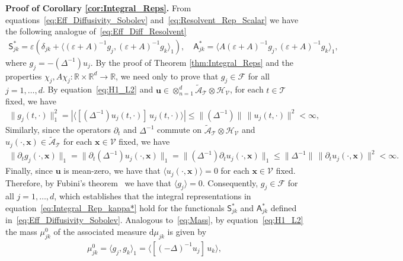\documentclass[leqno,onefignum,onetabnum]{siamltex1213}
\renewcommand{\d}{\mathrm{d}}
\newcommand{\Qb}{\mathbf{Q}}
\newcommand{\Tc}{\mathcal{T}}
\newcommand{\Vc}{\mathcal{V}}
\newcommand{\Sm}{\mathsf{S}}
\newcommand{\Am}{\mathsf{A}}
\newcommand{\Hs}{\mathscr{H}}
\newcommand{\As}{\mathscr{A}}
\newcommand{\Fs}{\mathscr{F}}
\newcommand\bnabla{\mbox{\boldmath${\nabla}$}}
\providecommand\bcdot{\boldsymbol{\cdot}}
\newcommand{\vecg}{\boldsymbol{g}}
\newcommand{\vecx}{\boldsymbol{x}}
\newcommand{\vecu}{\boldsymbol{u}}
\begin{document}
\textbf{Proof of Corollary \ref{cor:Integral_Reps}.}\hspace{1ex}
%
From equations~\eqref{eq:Eff_Diffusivity_Sobolev}
and~\eqref{eq:Resolvent_Rep_Scalar} we have the following analogue
of~\eqref{eq:Eff_Diff_Resolvent} 
%
\begin{align}%
 \Sm^*_{jk}=\varepsilon\left(\delta_{jk}+\langle(\varepsilon+A)^{-1}g_j,(\varepsilon+A)^{-1}g_k\rangle_1\right), \quad
 \Am^*_{jk}=\langle A(\varepsilon+A)^{-1}g_j,(\varepsilon+A)^{-1}g_k\rangle_1,
\end{align}
%
where $g_j=-(\Delta^{-1})u_j$. By the proof of Theorem
\ref{thm:Integral_Reps} and the properties
$\chi_j,A\chi_j:\mathbb{R}\times\mathbb{R}^d\to\mathbb{R}$, we need only to prove
that $g_j\in\Fs$ for all $j=1,\ldots,d$. By equation~\eqref{eq:H1_L2} and
$\vecu \in\otimes_{n=1}^d\tilde{\As}_{\Tc}\otimes\Hs_{\Vc}$, for each $t\in\Tc$
fixed, we have 
%
\begin{align}
  \|g_j(t,\cdot)\|_1^2%
             =|\langle[(\Delta^{-1})u_j(t,\cdot)]\,u_j(t,\cdot)\rangle|
             \leq\|(\Delta^{-1})\|\,\|u_j(t,\cdot)\|^2<\infty,
\end{align}
%
Similarly, since the operators $\partial_t$ and $\Delta^{-1}$ commute on
$\tilde{\As}_{\Tc}\otimes\Hs_{\Vc}$ and $u_j(\cdot,\vecx)\in\tilde{\As}_{\Tc}$
for each $\vecx\in\Vc$ fixed, we have 
%
\begin{align}
  \|\partial_tg_j(\cdot,\vecx)\|_1=\|\partial_t(\Delta^{-1})u_j(\cdot,\vecx)\|_1
                    =\|(\Delta^{-1})\partial_tu_j(\cdot,\vecx)\|_1
                    \leq\|\Delta^{-1}\|\,\|\partial_tu_j(\cdot,\vecx)\|^2<\infty.
\end{align}
%
Finally, since $\vecu$ is mean-zero, we have that
$\langle u_j(\cdot,\vecx)\rangle=0$ for each $\vecx\in\Vc$ fixed. Therefore, by 
Fubini's theorem~\cite{Folland:99} we have that
$\langle g_j\rangle=0$. Consequently, $g_j\in\Fs$ for all $j=1,\ldots,d$, which 
establishes that the integral representations in
equation~\eqref{eq:Integral_Rep_kappa*} hold for the functionals
$\Sm^*_{jk}$ and $\Am^*_{jk}$ defined
in~\eqref{eq:Eff_Diffusivity_Sobolev}. Analogous to~\eqref{eq:Mass},
by equation~\eqref{eq:H1_L2} the mass 
$\mu^0_{jk}$ of the associated measure $\d\mu_{jk}$ is given by  
% 
\begin{align}\label{eq:Mass_Scalar}
  \mu^0_{jk}
        =\langle g_j,g_k\rangle_1
        =\langle[(-\Delta)^{-1}u_j]\,u_k\rangle,   
\end{align}
\end{document}
